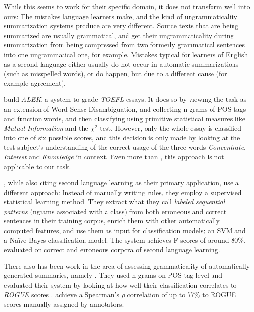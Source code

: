 \documentclass[a4paper,10pt]{scrartcl}
\theoremstyle{style}
\begin{document}
While this seems to work for their specific domain, it does not transform well into ours: The mistakes language learners make, and the kind of ungrammaticality summarization systems produce are very different. Source texts that are being summarized are usually grammatical, and get their ungrammaticality during summarization from being compressed from two formerly grammatical sentences into one ungrammatical one, for example. Mistakes typical for learners of English as a second language either usually do not occur in automatic summarizations (such as misspelled words), or do happen, but due to a different cause (for example agreement).

\cite{chodorow2000unsupervised} build \textit{ALEK}, a system to grade \textit{TOEFL} essays. It does so by viewing the task as an extension of Word Sense Disambiguation, and collecting n-grams of POS-tags and function words, and then classifying using primitive statistical measures like \textit{Mutual Information} and the $\chi^2$ test. However, only the whole essay is classified into one of six possible scores, and this decision is only made by looking at the test subject's understanding of the correct usage of the three words \textit{Concentrate}, \textit{Interest} and \textit{Knowledge} in context.
Even more than \cite{bender2004arboretum}, this approach is not applicable to our task.

\cite{sun2007detecting}, while also citing second language learning as their primary application, use a different approach: Instead of manually writing rules, they employ a supervised statistical learning method. They extract what they call \textit{labeled sequential patterns} (ngrams associated with a class) from both erroneous and correct sentences in their training corpus, enrich them with other automatically computed features, and use them as input for classification models; an SVM \citep[SVMlight,][]{Joachims/02a} and a Na\"ive Bayes classification model. The system achieves F-scores of around 80\%, evaluated on correct and erroneous corpora of second language learning.

There also has been work in the area of assessing grammaticality of automatically generated summaries, namely \cite{vadlapudi2010automated}. They used n-grams on POS-tag level and evaluated their system by looking at how well their classification correlates to \textit{ROGUE} scores \citep{lin2004rouge}. \citeauthor{vadlapudi2010automated} achieve a Spearman's $\rho{}$ correlation of up to 77\% to ROGUE scores manually assigned by annotators.
\end{document}
